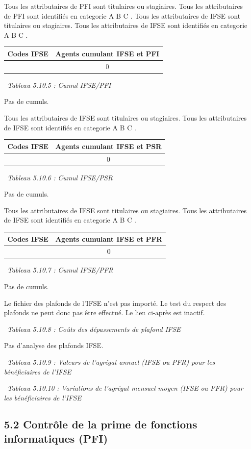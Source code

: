 Tous les attributaires de PFI sont titulaires ou stagiaires. Tous les
attributaires de PFI sont identifiés en categorie A B C . Tous les
attributaires de IFSE sont titulaires ou stagiaires. Tous les
attributaires de IFSE sont identifiés en categorie A B C .

\begin{longtable}[]{@{}cc@{}}
\toprule
Codes IFSE & Agents cumulant IFSE et PFI\tabularnewline
\midrule
\endhead
& 0\tabularnewline
\bottomrule
\end{longtable}

~\emph{Tableau 5.10.5 : Cumul IFSE/PFI}

Pas de cumuls.

Tous les attributaires de IFSE sont titulaires ou stagiaires. Tous les
attributaires de IFSE sont identifiés en categorie A B C .

\begin{longtable}[]{@{}cc@{}}
\toprule
Codes IFSE & Agents cumulant IFSE et PSR\tabularnewline
\midrule
\endhead
& 0\tabularnewline
\bottomrule
\end{longtable}

~\emph{Tableau 5.10.6 : Cumul IFSE/PSR}

Pas de cumuls.

Tous les attributaires de IFSE sont titulaires ou stagiaires. Tous les
attributaires de IFSE sont identifiés en categorie A B C .

\begin{longtable}[]{@{}cc@{}}
\toprule
Codes IFSE & Agents cumulant IFSE et PFR\tabularnewline
\midrule
\endhead
& 0\tabularnewline
\bottomrule
\end{longtable}

~\emph{Tableau 5.10.7 : Cumul IFSE/PFR}

Pas de cumuls.

Le fichier des plafonds de l'IFSE n'est pas importé. Le test du respect
des plafonds ne peut donc pas être effectué. Le lien ci-après est
inactif.

~\emph{Tableau 5.10.8 : Coûts des dépassements de plafond IFSE}

Pas d'analyse des plafonds IFSE.

~\emph{Tableau 5.10.9 : Valeurs de l'agrégat annuel (IFSE ou PFR) pour
les bénéficiaires de l'IFSE}

~\emph{Tableau 5.10.10 : Variations de l'agrégat mensuel moyen (IFSE ou
PFR) pour les bénéficiaires de l'IFSE}

\hypertarget{controle-de-la-prime-de-fonctions-informatiques-pfi}{%
\subsection{5.2 Contrôle de la prime de fonctions informatiques
(PFI)}\label{controle-de-la-prime-de-fonctions-informatiques-pfi}}

